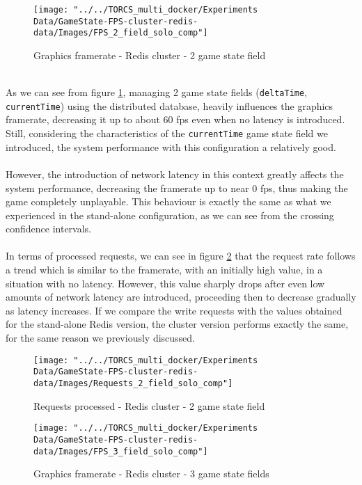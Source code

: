 \begin{figure}[h!]
	\centering
	\texttt{[image: "../../TORCS\_multi\_docker/Experiments Data/GameState-FPS-cluster-redis-data/Images/FPS\_2\_field\_solo\_comp"]}
	\caption[Graphics framerate - Redis cluster - 2 game state field]{Graphics framerate - Redis cluster - 2 game state field}
	\label{fig:fps-2-field-redis-cluster}
\end{figure}
\\ As we can see from figure \ref{fig:fps-2-field-redis-cluster}, managing 2 game state fields (\texttt{deltaTime}, \texttt{currentTime}) using the distributed database, heavily influences the graphics framerate, decreasing it up to about 60 fps even when no latency is introduced. Still, considering the characteristics of the \texttt{currentTime} game state field we introduced, the system performance with this configuration a relatively good. \\ \\
However, the introduction of network latency in this context greatly affects the system performance, decreasing the framerate up to near 0 fps, thus making the game completely unplayable. This behaviour is exactly the same as what we experienced in the stand-alone configuration, as we can see from the crossing confidence intervals. \\ \\
In terms of processed requests, we can see in figure \ref{fig:requests-2-field-redis-cluster} that the request rate follows a trend which is similar to the framerate, with an initially high value, in a situation with no latency. However, this value sharply drops after even low amounts of network latency are introduced, proceeding then to decrease gradually as latency increases. If we compare the write requests with the values obtained for the stand-alone Redis version, the cluster version performs exactly the same, for the same reason we previously discussed. \\
\begin{figure}[h!]
	\centering
	\texttt{[image: "../../TORCS\_multi\_docker/Experiments Data/GameState-FPS-cluster-redis-data/Images/Requests\_2\_field\_solo\_comp"]}
	\caption[Requests processed - Redis cluster - 2 game state field]{Requests processed - Redis cluster - 2 game state field}
	\label{fig:requests-2-field-redis-cluster}
\end{figure}
\begin{figure}[h!]
	\centering
	\texttt{[image: "../../TORCS\_multi\_docker/Experiments Data/GameState-FPS-cluster-redis-data/Images/FPS\_3\_field\_solo\_comp"]}
	\caption[Graphics framerate - Redis cluster - 3 game state fields]{Graphics framerate - Redis cluster - 3 game state fields}
	\label{fig:fps-3-field-redis-cluster}
\end{figure}
